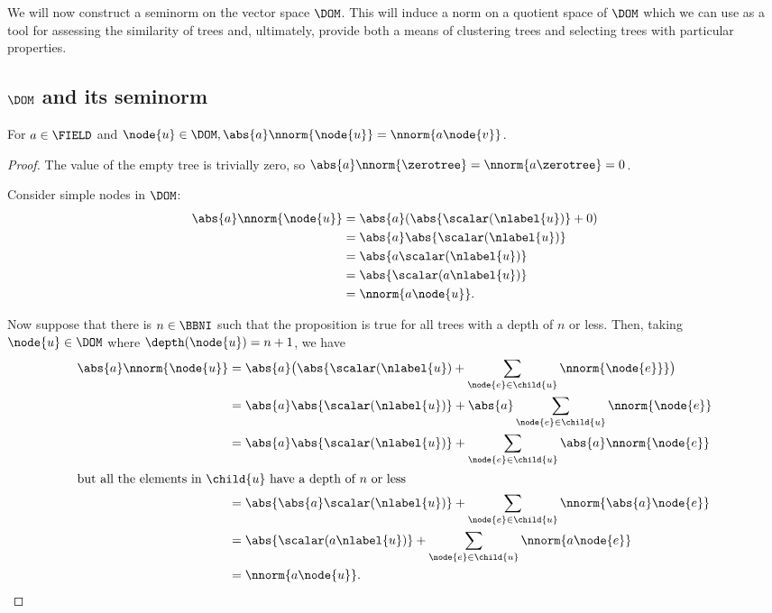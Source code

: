 \begin{definition}
We will now construct a seminorm on the vector space
$\DOM$. This will induce a norm on a quotient space of $\DOM$ which we
can use as a tool for assessing the similarity of trees and,
ultimately, provide both a means of clustering trees and selecting
trees with particular properties.

\subsection{$\DOM$ and its seminorm}

\begin{proposition}\label{absolutehomogeneity}
  For $a \in \FIELD$ and $\node{u} \in \DOM, \abs{a}\nnorm{\node{u}} =
  \nnorm{a \node{v}}$.
  \begin{proof}
    The value of the empty tree is trivially zero, so $\abs{a}\nnorm{\zerotree} =
    \nnorm{a\zerotree} = 0$.

    Consider simple nodes in $\DOM$:
    \begin{align}
      \abs{a}\nnorm{\node{u}} &= \abs{a}(\abs{\scalar(\nlabel{u})} + 0) \\
      &= \abs{a}\abs{\scalar(\nlabel{u})} \\
      &= \abs{a\scalar(\nlabel{u})} \\
      &= \abs{\scalar(a\nlabel{u})} \\
      &= \nnorm{a \node{u}}.
    \end{align}

    Now suppose that there is $n \in \BBNI$ such that the proposition is true for
    all trees with a depth of $n$ or less. Then, taking $\node{u} \in
    \DOM$ where $\depth(\node{u}) = n+1$, we have
    \begin{align}
      \abs{a}\nnorm{\node{u}} &= \abs{a}\bigl(\abs{\scalar(\nlabel{u}) + \sum_{\node{e}\in\child{u}}\nnorm{\node{e}}}\bigr) \\
      &= \abs{a}\abs{\scalar(\nlabel{u})} + \abs{a}\sum_{\node{e}\in\child{u}}\nnorm{\node{e}}\\
      &= \abs{a}\abs{\scalar(\nlabel{u})} + \sum_{\node{e}\in\child{u}}\abs{a}\nnorm{\node{e}}\\
      \intertext{but all the elements in $\child{u}$ have a depth of $n$ or less}
      &= \abs{\abs{a}\scalar(\nlabel{u})} + \sum_{\node{e}\in\child{u}}\nnorm{\abs{a}\node{e}} \\
      &= \abs{\scalar(a\nlabel{u})} + \sum_{\node{e}\in\child{u}}\nnorm{a \node{e}} \\
      &= \nnorm{a \node{u}}.
    \end{align}


\end{proof}
\end{proposition}
\end{definition}
